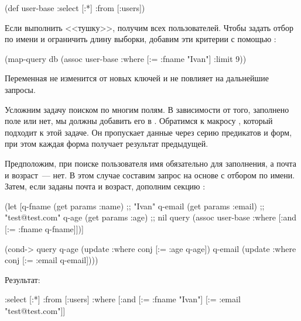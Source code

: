 \begin{english}
  \begin{clojure}
(def user-base
  {:select [:*]
   :from [:users]})
  \end{clojure}
\end{english}

Если выполнить <<тушку>>, получим всех пользователей. Чтобы задать отбор по имени и ограничить длину выборки, добавим эти критерии с помощью :

\begin{english}
  \begin{clojure}
(map-query db
           (assoc user-base
                  :where [:= :fname "Ivan"]
                  :limit 9))
  \end{clojure}
\end{english}

Переменная  не изменится от новых ключей и не повлияет на дальнейшие запросы.

Усложним задачу поиском по многим полям. В зависимости от того, заполнено поле или нет, мы должны добавить его в . Обратимся к макросу , который подходит к этой задаче. Он пропускает данные через серию предикатов и форм, при этом каждая форма получает результат предыдущей.

Предположим, при поиске пользователя имя обязательно для заполнения, а почта и возраст~--- нет. В этом случае составим запрос на основе  с отбором по имени. Затем, если заданы почта и возраст, дополним секцию :

\begin{english}
  \begin{clojure}
(let [q-fname (get params :name)  ;; "Ivan"
      q-email (get params :email) ;; "test@test.com"
      q-age   (get params :age)   ;; nil
      query
      (assoc user-base
             :where [:and [:= :fname q-fname]])]

  (cond-> query
    q-age
    (update :where conj [:= :age q-age])
    q-email
    (update :where conj [:= :email q-email])))
  \end{clojure}
\end{english}

Результат:

\begin{english}
  \begin{clojure}
{:select [:*]
 :from [:users]
 :where [:and
         [:= :fname "Ivan"]
         [:= :email "test@test.com"]]}
  \end{clojure}
\end{english}

